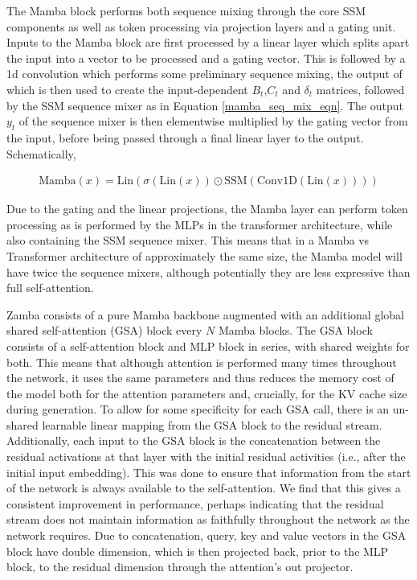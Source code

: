 The Mamba block performs both sequence mixing through the core SSM components as well as token processing via projection layers and a gating unit. Inputs to the Mamba block are first processed by a linear layer which splits apart the input into a vector to be processed and a gating vector. This is followed by a 1d convolution which performs some preliminary sequence mixing, the output of which is then used to create the input-dependent $B_t$,$C_t$ and $\delta_t$ matrices, followed by the SSM sequence mixer as in Equation \ref{mamba_seq_mix_eqn}. The output $y_t$ of the sequence mixer is then elementwise multiplied by the gating vector from the input, before being passed through a final linear layer to the output. Schematically,

\begin{align}
    \text{Mamba}(x) = \text{Lin} (\sigma(\text{Lin}(x)) \odot \text{SSM}(\text{Conv1D}(\text{Lin}(x))))
\end{align}

Due to the gating and the linear projections, the Mamba layer can perform token processing as is performed by the MLPs in the transformer architecture, while also containing the SSM sequence mixer. This means that in a Mamba vs Transformer architecture of approximately the same size, the Mamba model will have twice the sequence mixers, although potentially they are less expressive than full self-attention.

Zamba consists of a pure Mamba backbone augmented with an additional global shared self-attention (GSA) block every $N$ Mamba blocks. The GSA block consists of a self-attention block and MLP block in series, with shared weights for both. This means that although attention is performed many times throughout the network, it uses the same parameters and thus reduces the memory cost of the model both for the attention parameters and, crucially, for the KV cache size during generation. To allow for some specificity for each GSA call, there is an un-shared learnable linear mapping from the GSA block to the residual stream. Additionally, each input to the GSA block is the concatenation between the residual activations at that layer with the initial residual activities (i.e., after the initial input embedding). This was done to ensure that information from the start of the network is always available to the self-attention. We find that this gives a consistent improvement in performance, perhaps indicating that the residual stream does not maintain information as faithfully throughout the network as the network requires. Due to concatenation, query, key and value vectors in the GSA block have double dimension, which is then projected back, prior to the MLP block, to the residual dimension through the attention's out projector. 

